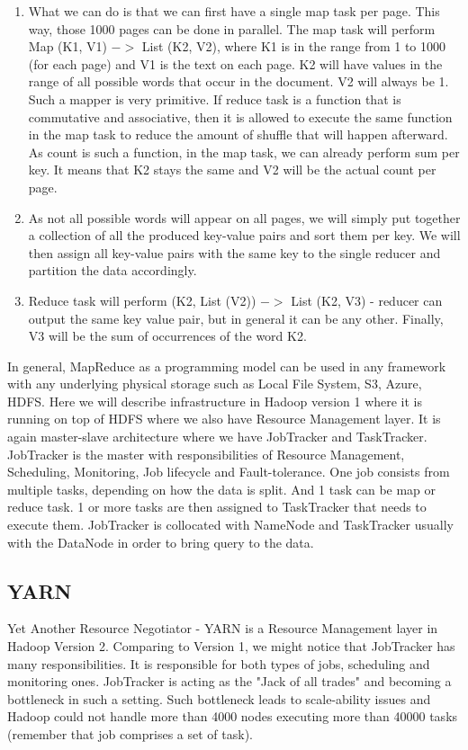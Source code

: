\begin{enumerate}
	\item What we can do is that we can first have a single map task per page. This way, those 1000 pages can be done in parallel. The map task will perform Map (K1, V1) $->$ List (K2, V2), where K1 is in the range from 1 to 1000 (for each page) and V1 is the text on each page. K2 will have values in the range of all possible words that occur in the document. V2 will always be 1. Such a mapper is very primitive. If reduce task is a function that is commutative and associative, then it is allowed to execute the same function in the map task to reduce the amount of shuffle that will happen afterward. As count is such a function, in the map task, we can already perform sum per key. It means that K2 stays the same and V2 will be the actual count per page.
	\item As not all possible words will appear on all pages, we will simply put together a collection of all the produced key-value pairs and sort them per key. We will then assign all key-value pairs with the same key to the single reducer and partition the data accordingly.
	\item Reduce task will perform (K2, List (V2)) $->$ List (K2, V3) - reducer can output the same key value pair, but in general it can be any other. Finally, V3 will be the sum of occurrences of the word K2.
\end{enumerate}
   
In general, MapReduce as a programming model can be used in any framework with any underlying physical storage such as Local File System, S3, Azure, HDFS. Here we will describe infrastructure in Hadoop version 1 where it is running on top of HDFS where we also have Resource Management layer. It is again master-slave architecture where we have JobTracker and TaskTracker. JobTracker is the master with responsibilities of Resource Management, Scheduling, Monitoring, Job lifecycle and Fault-tolerance. One job consists from multiple tasks, depending on how the data is split. And 1 task can be map or reduce task. 1 or more tasks are then assigned to TaskTracker that needs to execute them. JobTracker is collocated with NameNode and TaskTracker usually with the DataNode in order to bring query to the data. 

\subsection{YARN}
Yet Another Resource Negotiator -  YARN \cite{YARN} is a Resource Management layer in Hadoop Version 2. Comparing to Version 1, we might notice that JobTracker has many responsibilities. It is responsible for both types of jobs, scheduling and monitoring ones. JobTracker is acting as the "Jack of all trades" and becoming a bottleneck in such a setting. Such bottleneck leads to scale-ability issues and Hadoop could not handle more than 4000 nodes executing more than 40000 tasks (remember that job comprises a set of task). 

